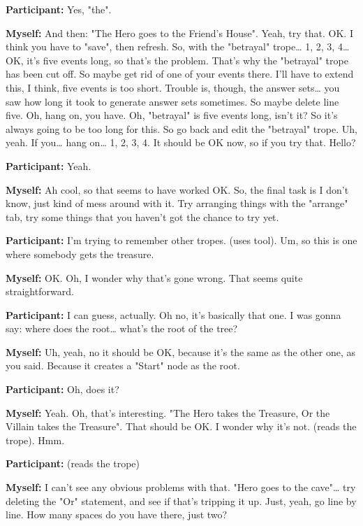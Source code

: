 \documentclass[11pt]{report}
\begin{document}
\begin{linenumbers}
\textbf{Participant:} Yes, "the".

\textbf{Myself:} And then: "The Hero goes to the Friend's House". Yeah, try
that. OK. I think you have to "save", then refresh. So, with the "betrayal"
trope\ldots{} 1, 2, 3, 4\ldots{} OK, it's five events long, so that's the
problem. That's why the "betrayal" trope has been cut off. So maybe get rid of
one of your events there. I'll have to extend this, I think, five events is too
short. Trouble is, though, the answer sets\ldots{} you saw how long it took to
generate answer sets sometimes. So maybe delete line five. Oh, hang on, you
have. Oh, "betrayal" is five events long, isn't it? So it's always going to be
too long for this. So go back and edit the "betrayal" trope. Uh, yeah. If
you\ldots{} hang on\ldots{} 1, 2, 3, 4. It should be OK now, so if you try that.
Hello?

\textbf{Participant:} Yeah.

\textbf{Myself:} Ah cool, so that seems to have worked OK. So, the final task is I don't know, just kind of mess around with it. Try arranging things with the "arrange" tab, try some things that you haven't got the chance to try yet.

\textbf{Participant:} I'm trying to remember other tropes. (uses tool). Um, so this is one where somebody gets the treasure.

\textbf{Myself:} OK. Oh, I wonder why that's gone wrong. That seems quite straightforward.

\textbf{Participant:} I can guess, actually. Oh no, it's basically that one. I was gonna say: where does the root\ldots{} what's the root of the tree?

\textbf{Myself:} Uh, yeah, no it should be OK, because it's the same as the other one, as you said. Because it creates a "Start" node as the root.

\textbf{Participant:} Oh, does it?

\textbf{Myself:} Yeah. Oh, that's interesting. "The Hero takes the Treasure, Or the Villain takes the Treasure". That should be OK. I wonder why it's not. (reads the trope). Hmm.

\textbf{Participant:} (reads the trope)

\textbf{Myself:} I can't see any obvious problems with that. "Hero goes to the cave"\ldots{} try deleting the "Or" statement, and see if that's tripping it up. Just, yeah, go line by line. How many spaces do you have there, just two?


\end{linenumbers}
\end{document}
